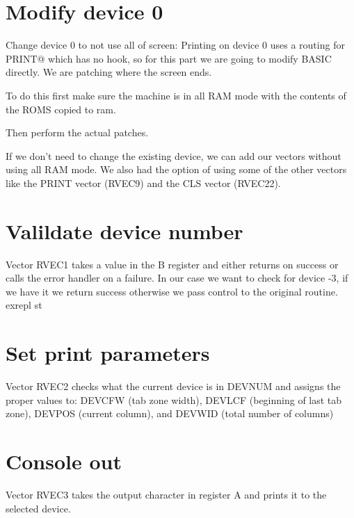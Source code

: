 \documentclass{article}
\begin{document}
\section{Modify device 0}
Change device 0 to not use all of screen: Printing on device 0 uses a
routing for PRINT@ which has no hook, so for this part we are going to
modify BASIC directly. We are patching where the screen ends.

To do this first make sure the machine is in all RAM mode with the
contents of the ROMS copied to ram.



Then perform the actual patches.



If we don't need to change the existing device, we can add our vectors
without using all RAM mode. We also had the option of using some of
the other vectors like the PRINT vector (RVEC9) and the CLS vector
(RVEC22).

\section{Valildate device number}
Vector RVEC1 takes a value in the B register and either returns on
success or calls the error handler on a failure. In our case we want
to check for device -3, if we have it we return success otherwise we
pass control to the original routine.
exrepl st



\section{Set print parameters}
Vector RVEC2 checks what the current device is in DEVNUM and assigns
the proper values to: DEVCFW (tab zone width), DEVLCF (beginning of
last tab zone), DEVPOS (current column), and DEVWID (total number of
columns)



\section{Console out}
Vector RVEC3 takes the output character in register A and prints it to
the selected device.


\end{document}
